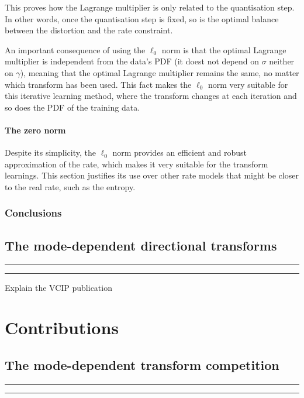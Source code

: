 \documentclass[11pt,a4paper,openright,twoside]{book}
\providecommand{\chaptertoc}{
	\startcontents[chapters]
	\hrule
	\vspace{1em}
	\printcontents[chapters]{}{1}{{\bf\large Contents}}
	\hrule
}
\numberwithin{equation}{section} %
\begin{document}
This proves how the Lagrange multiplier is only related to the
quantisation step.
In other words, once the quantisation step is fixed, so is the optimal
balance between the distortion and the rate constraint.

An important consequence of using the $\ell_0$ norm is that the optimal
Lagrange multiplier is independent from the data's \ac{PDF} (it doest
not depend on $\sigma$ neither on $\gamma$), meaning that the optimal
Lagrange multiplier remains the same, no matter which transform has been
used.
This fact makes the $\ell_0$ norm very suitable for this iterative
learning method, where the transform changes at each iteration and so
does the \ac{PDF} of the training data.

\subsection{The zero norm }
\label{sub:the_zero_norm}

Despite its simplicity, the $\ell_0$ norm provides an efficient and
robust approximation of the rate, which makes it very suitable for the
transform learnings.
This section justifies its use over other rate models that might be
closer to the real rate, such as the entropy.

\section{Conclusions}
\label{sec:conclusions_transforms}

\chapter{The mode-dependent directional transforms}
\label{cha:the_mode_dependent_directional_transforms}
\chaptertoc

\vspace{0.5cm}
Explain the VCIP publication~\cite{arrufat-14-mddt-rdot}

\part{Contributions}
\label{prt:contributions}

\chapter{The mode-dependent transform competition}
\label{cha:the_mode_dependent_transform_competition}
\chaptertoc
\end{document}

